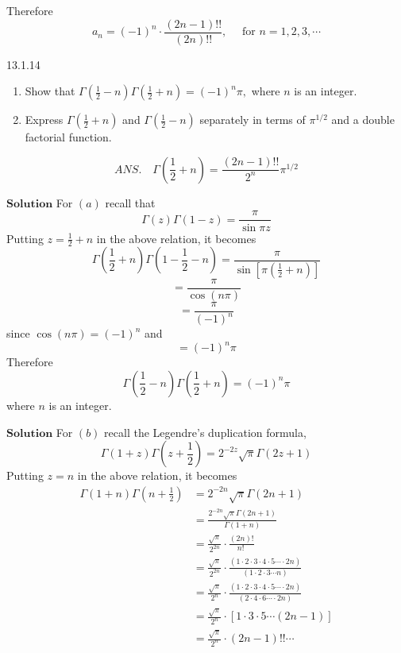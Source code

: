Therefore
$$
a_{n}=(-1)^{n} \cdot \frac{(2 n-1) ! !}{(2 n) ! !}, \quad \text { for } n=1,2,3, \cdots
$$

\newpage

\begin{mybox}{13.1.14}
\begin{enumerate}[$(a)$]
\item Show that $\Gamma\left(\frac{1}{2}-n\right) \Gamma\left(\frac{1}{2}+n\right)=(-1)^{n} \pi,$ where $n$ is an integer. 
\item Express $\Gamma\left(\frac{1}{2}+n\right)$ and $\Gamma\left(\frac{1}{2}-n\right)$ separately in terms of $\pi^{1 / 2}$ and a double factorial function.
\end{enumerate}
$$
A N S . \quad \Gamma\left(\frac{1}{2}+n\right)=\frac{(2 n-1) ! !}{2^{n}} \pi^{1 / 2}
$$
\end{mybox}

$\boxed{\textbf{Solution}}$ For $(a)$ recall that 
$$\Gamma(z) \Gamma(1-z)=\frac{\pi}{\sin \pi z}$$
Putting $z=\frac{1}{2}+n$ in the above relation, it becomes
$$
\Gamma\left(\frac{1}{2}+n\right) \Gamma\left(1-\frac{1}{2}-n\right)=\frac{\pi}{\sin \left[\pi\left(\frac{1}{2}+n\right)\right]}
$$
$$
=\frac{\pi}{\cos (n \pi)}
$$
$$
=\frac{\pi}{(-1)^{n}}
$$
since $\cos (n \pi)=(-1)^{n}$ and
$$
=(-1)^{n} \pi
$$
Therefore 
$$\Gamma\left(\frac{1}{2}-n\right) \Gamma\left(\frac{1}{2}+n\right)=(-1)^{n} \pi$$ where $n$ is an integer.

$\boxed{\textbf{Solution}}$ For $(b)$ recall the Legendre's duplication formula,
$$\Gamma(1+z) \Gamma\left(z+\frac{1}{2}\right)=2^{-2 z} \sqrt{\pi} \Gamma(2 z+1)$$
Putting $z=n$ in the above relation, it becomes
$$
\begin{aligned}
\Gamma(1+n) \Gamma\left(n+\frac{1}{2}\right)&=2^{-2 n} \sqrt{\pi} \Gamma(2 n+1) \\
&=\frac{2^{-2 n} \sqrt{\pi} \Gamma(2 n+1)}{\Gamma(1+n)} \\
&=\frac{\sqrt{\pi}}{2^{2 n}} \cdot \frac{(2 n) !}{n! \ } \\
&=\frac{\sqrt{\pi}}{2^{2 n}} \cdot \frac{(1 \cdot 2  \cdot 3  \cdot 4  \cdot 5   \cdots   \cdot 2 n)}{(1 \cdot 2  \cdot 3  \cdots n)} \\
&=\frac{\sqrt{\pi}}{2^{n}} \cdot \frac{(1 \cdot 2  \cdot 3  \cdot 4  \cdot 5   \cdots   \cdot 2 n)}{(2 \cdot 4  \cdot 6   \cdots   \cdot 2 n)} \\
&=\frac{\sqrt{\pi}}{2^{n}} \cdot[1 \cdot 3  \cdot 5   \cdots (2 n-1)] \\
&=\frac{\sqrt{\pi}}{2^{n}} \cdot(2 n-1) ! ! \cdots 
\end{aligned}
$$

